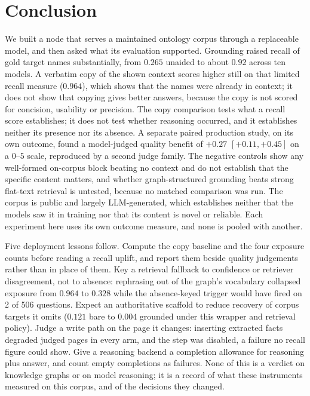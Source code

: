 \documentclass[10pt,twocolumn]{article}
\begin{document}
\section{Conclusion}\label{sec:conclusion}
We built a node that serves a maintained ontology corpus through a replaceable model, and then asked what its evaluation supported. Grounding raised recall of gold target names substantially, from $0.265$ unaided to about $0.92$ across ten models. A verbatim copy of the shown context scores higher still on that limited recall measure ($0.964$), which shows that the names were already in context; it does not show that copying gives better answers, because the copy is not scored for concision, usability or precision. The copy comparison tests what a recall score establishes; it does not test whether reasoning occurred, and it establishes neither its presence nor its absence. A separate paired production study, on its own outcome, found a model-judged quality benefit of $+0.27$ $[+0.11,+0.45]$ on a $0$--$5$ scale, reproduced by a second judge family. The negative controls show any well-formed on-corpus block beating no context and do not establish that the specific content matters, and whether graph-structured grounding beats strong flat-text retrieval is untested, because no matched comparison was run. The corpus is public and largely LLM-generated, which establishes neither that the models saw it in training nor that its content is novel or reliable. Each experiment here uses its own outcome measure, and none is pooled with another.

Five deployment lessons follow. Compute the copy baseline and the four exposure counts before reading a recall uplift, and report them beside quality judgements rather than in place of them. Key a retrieval fallback to confidence or retriever disagreement, not to absence: rephrasing out of the graph's vocabulary collapsed exposure from $0.964$ to $0.328$ while the absence-keyed trigger would have fired on 2 of 506 questions. Expect an authoritative scaffold to reduce recovery of corpus targets it omits ($0.121$ bare to $0.004$ grounded under this wrapper and retrieval policy). Judge a write path on the page it changes: inserting extracted facts degraded judged pages in every arm, and the step was disabled, a failure no recall figure could show. Give a reasoning backend a completion allowance for reasoning plus answer, and count empty completions as failures. None of this is a verdict on knowledge graphs or on model reasoning; it is a record of what these instruments measured on this corpus, and of the decisions they changed.
\end{document}
